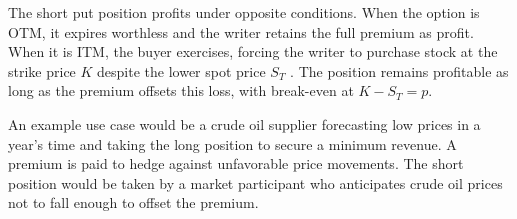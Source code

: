 \documentclass[english,12pt,a4paper,pdftex,sci,utf8]{aaltothesis}
\begin{document}
The short put position profits under opposite conditions. When the option is OTM, it expires worthless and the writer retains the full premium as profit. When it is ITM, the buyer exercises, forcing the writer to purchase stock at the strike price $K$ despite the lower spot price $S_T$ \cite{hull2013fundamentals}. The position remains profitable as long as the premium offsets this loss, with break-even at $K - S_T = p$.

An example use case would be a crude oil supplier forecasting low prices in a year's time and taking the long position to secure a minimum revenue. A premium is paid to hedge against unfavorable price movements. The short position would be taken by a market participant who anticipates crude oil prices not to fall enough to offset the premium.


\begin{figure}[H]
\centering


\end{figure}
\end{document}
